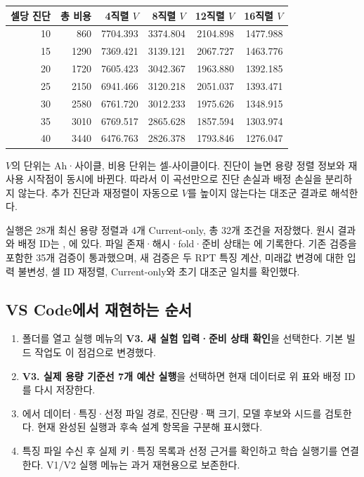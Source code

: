 \begin{center}
\begin{tabular}{rrrrrr}
\toprule
셀당 진단 & 총 비용 & 4직렬 $V$ & 8직렬 $V$ & 12직렬 $V$ & 16직렬 $V$ \\
\midrule
10 & 860   & 7704.393 & 3374.804 & 2104.898 & 1477.988 \\
15 & 1290  & 7369.421 & 3139.121 & 2067.727 & 1463.776 \\
20 & 1720  & 7605.423 & 3042.367 & 1963.880 & 1392.185 \\
25 & 2150  & 6941.466 & 3120.218 & 2051.037 & 1393.471 \\
30 & 2580  & 6761.720 & 3012.233 & 1975.626 & 1348.915 \\
35 & 3010  & 6769.517 & 2865.628 & 1857.594 & 1303.974 \\
40 & 3440  & 6476.763 & 2826.378 & 1793.846 & 1276.047 \\
\bottomrule
\end{tabular}
\end{center}

$V$의 단위는 Ah·사이클, 비용 단위는 셀-사이클이다. 진단이 늘면 용량 정렬 정보와 재사용 시작점이 동시에 바뀐다. 따라서 이 곡선만으로 진단 손실과 배정 손실을 분리하지 않는다. 추가 진단과 재정렬이 자동으로 $V$를 높이지 않는다는 대조군 결과로 해석한다.

실행은 28개 최신 용량 정렬과 4개 Current-only, 총 32개 조건을 저장했다. 원시 결과와 배정 ID는 , 에 있다. 파일 존재·해시·fold·준비 상태는 에 기록한다. 기존 검증을 포함한 35개 검증이 통과했으며, 새 검증은 두 RPT 특징 계산, 미래값 변경에 대한 입력 불변성, 셀 ID 재정렬, Current-only와 초기 대조군 일치를 확인했다.

\subsection*{VS Code에서 재현하는 순서}
\begin{enumerate}
\item {} 폴더를 열고 실행 메뉴의 \textbf{V3. 새 실험 입력·준비 상태 확인}을 선택한다. 기본 빌드 작업도 이 점검으로 변경했다.
\item \textbf{V3. 실제 용량 기준선 7개 예산 실행}을 선택하면 현재 데이터로 위 표와 배정 ID를 다시 저장한다.
\item {}에서 데이터·특징·선정 파일 경로, 진단량·팩 크기, 모델 후보와 시드를 검토한다. 현재 완성된 실행과 후속 설계 항목을 구분해 표시했다.
\item 특징 파일 수신 후 실제 키·특징 목록과 선정 근거를 확인하고 학습 실행기를 연결한다. V1/V2 실행 메뉴는 과거 재현용으로 보존한다.
\end{enumerate}

